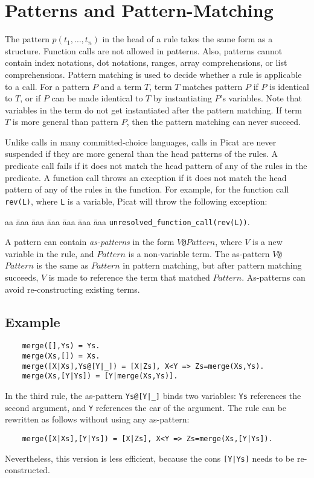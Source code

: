 \section{Patterns and Pattern-Matching}
The pattern $p(t_1,\ldots,t_n)$ in the head of a rule takes the same form as a structure. Function calls are not allowed in patterns. Also, patterns cannot contain index notations, dot notations, ranges, array comprehensions, or list comprehensions. Pattern matching is used to decide whether a rule is applicable to a call. For a pattern $P$ and a term $T$, term $T$ matches pattern $P$ if $P$ is identical to $T$, or if $P$ can be made identical to $T$ by instantiating $P$'s variables. Note that variables in the term do not get instantiated after the pattern matching. If term $T$ is more general than pattern $P$, then the pattern matching can never succeed.

Unlike calls in many committed-choice languages, calls in Picat are never suspended if they are more general than the head patterns of the rules. A predicate call fails if it does not match the head pattern of any of the rules in the predicate. A function call throws an exception if it does not match the head pattern of any of the rules in the function. For example, for the function call \texttt{rev(L)}, where \texttt{L} is a variable, Picat will throw the following exception:

\begin{tabbing}
aa \= aaa \= aaa \= aaa \= aaa \= aaa \= aaa \kill
\> \> \texttt{unresolved\_function\_call(rev(L))}.
\end{tabbing}

A pattern can contain \emph{as-patterns} in the form \texttt{$V$@$Pattern$}, where $V$ is a new variable in the rule, and $Pattern$ is a non-variable term. The as-pattern \texttt{$V$@$Pattern$} is the same as \texttt{$Pattern$} in pattern matching, but after pattern matching succeeds, $V$ is made to reference the term that matched $Pattern$. As-patterns can avoid re-constructing existing terms.

\subsection*{Example}
\begin{verbatim}
    merge([],Ys) = Ys.
    merge(Xs,[]) = Xs.
    merge([X|Xs],Ys@[Y|_]) = [X|Zs], X<Y => Zs=merge(Xs,Ys). 
    merge(Xs,[Y|Ys]) = [Y|merge(Xs,Ys)].
\end{verbatim}
In the third rule, the as-pattern \texttt{Ys@[Y|\_]} binds two variables: \texttt{Ys} references the second argument, and \texttt{Y} references the car of the argument. The rule can be rewritten as follows without using any as-pattern:
\begin{verbatim}
    merge([X|Xs],[Y|Ys]) = [X|Zs], X<Y => Zs=merge(Xs,[Y|Ys]). 
\end{verbatim}
Nevertheless, this version is less efficient, because the cons \texttt{[Y|Ys]} needs to be re-constructed.


